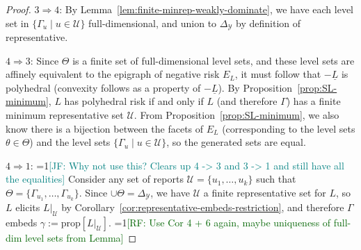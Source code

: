 \documentclass[11pt]{article}
\newcommand{\Comments}{1}
\newcommand{\mynote}[2]{\ifnum\Comments=1\textcolor{#1}{#2}\fi}
\newcommand{\raf}[1]{\mynote{darkgreen}{[RF: #1]}}
\newcommand{\jessie}[1]{\mynote{teal}{[JF: #1]}}
\newcommand{\prop}[1]{\mathrm{prop}[#1]}
\newcommand{\simplex}{\Delta_\Y}
\newcommand{\U}{\mathcal{U}}
\newcommand{\Y}{\mathcal{Y}}
\newcommand{\risk}[1]{\underline{#1}}
\begin{document}
\begin{proof}
$3 \Rightarrow 4$:
By Lemma~\ref{lem:finite-minrep-weakly-dominate}, we have each level set in $\{\Gamma_u \mid u \in \U\}$ full-dimensional, and union to $\simplex$ by definition of representative.

$4 \Rightarrow 3$:
Since $\Theta$ is a finite set of full-dimensional level sets, and these level sets are affinely equivalent to the epigraph of negative risk $E_L$, it must follow that $-\risk L$ is polyhedral (convexity follows as a property of $-\risk L$). 
By Proposition~\ref{prop:SL-minimum}, $L$ has polyhedral risk if and only if $L$ (and therefore $\Gamma$) has a finite minimum representative set $\U$.
From Proposition~\ref{prop:SL-minimum}, we also know there is a bijection between the facets of $E_L$ (corresponding to the level sets $\theta \in \Theta$) and the level sets $\{\Gamma_u \mid u \in \U\}$, so the generated sets are equal.

$4 \Rightarrow 1$: \jessie{Why not use this? Clears up 4 -> 3 and 3 -> 1 and still have all the equalities}
Consider any set of reports $\U = \{u_1, \ldots, u_k\}$ such that $\Theta = \{\Gamma_{u_1}, \ldots, \Gamma_{u_k}\}$.
Since $\cup \Theta = \simplex$, we have $\U$ a finite representative set for $L$, so $L$ elicits $L|_\U$ by Corollary~\ref{cor:representative-embeds-restriction}, and therefore $\Gamma$ embeds $\gamma := \prop{L|_\U}$. 
\raf{Use Cor 4 + 6 again, maybe uniqueness of full-dim level sets from Lemma}

\end{proof}
\end{document}
